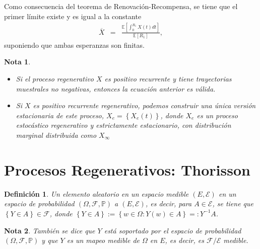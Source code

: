 \documentclass{article}
\newtheorem{Def}{Definición}
\newtheorem{Note}{Nota}
\newcommand{\esp}{\mathbb{E}}
\newcommand{\prob}{\mathbb{P}}
\begin{document}
Como consecuencia del teorema de Renovaci\'on-Recompensa, se tiene que el primer l\'imite  existe y es igual a la constante
\begin{eqnarray*}
\overline{X}&=&\frac{\esp\left[\int_{0}^{R_{1}}X\left(t\right)dt\right]}{\esp\left[R_{1}\right]},
\end{eqnarray*}
suponiendo que ambas esperanzas son finitas.

\begin{Note}
\begin{itemize}
\item[a)] Si el proceso regenerativo $X$ es positivo recurrente y tiene trayectorias muestrales no negativas, entonces la ecuaci\'on anterior es v\'alida.
\item[b)] Si $X$ es positivo recurrente regenerativo, podemos construir una \'unica versi\'on estacionaria de este proceso, $X_{e}=\left\{X_{e}\left(t\right)\right\}$, donde $X_{e}$ es un proceso estoc\'astico regenerativo y estrictamente estacionario, con distribuci\'on marginal distribuida como $X_{\infty}$
\end{itemize}
\end{Note}

\section{Procesos Regenerativos: Thorisson}

\begin{Def}
Un elemento aleatorio en un espacio medible $\left(E,\mathcal{E}\right)$ en un espacio de probabilidad $\left(\Omega,\mathcal{F},\prob\right)$ a $\left(E,\mathcal{E}\right)$, es decir,
para $A\in \mathcal{E}$,  se tiene que $\left\{Y\in A\right\}\in\mathcal{F}$, donde $\left\{Y\in A\right\}:=\left\{w\in\Omega:Y\left(w\right)\in A\right\}=:Y^{-1}A$.
\end{Def}

\begin{Note}
Tambi\'en se dice que $Y$ est\'a soportado por el espacio de probabilidad $\left(\Omega,\mathcal{F},\prob\right)$ y que $Y$ es un mapeo medible de $\Omega$ en $E$, es decir, es $\mathcal{F}/\mathcal{E}$ medible.
\end{Note}
\end{document}
